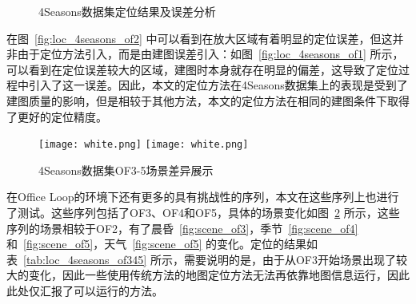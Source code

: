 \begin{figure}
  \centering
  \caption{4Seasons数据集定位结果及误差分析}
  \label{fig:loc_gnssmap}
\end{figure}

在图~\ref{fig:loc_4seasons_of2} 中可以看到在放大区域有着明显的定位误差，但这并非由于定位方法引入，而是由建图误差引入：如图~\ref{fig:loc_4seasons_of1} 所示，可以看到在定位误差较大的区域，建图时本身就存在明显的偏差，这导致了定位过程中引入了这一误差。因此，本文的定位方法在4Seasons数据集上的表现是受到了建图质量的影响，但是相较于其他方法，本文的定位方法在相同的建图条件下取得了更好的定位精度。

\begin{figure}
  \centering
  \texttt{[image: white.png]}
  \texttt{[image: white.png]}
  \caption{4Seasons数据集OF3-5场景差异展示}
  \label{fig:scene_of}
\end{figure}

在Office Loop的环境下还有更多的具有挑战性的序列，本文在这些序列上也进行了测试。这些序列包括了OF3、OF4和OF5，具体的场景变化如图~\ref{fig:scene_of} 所示，这些序列的场景相较于OF2，有了晨昏~\ref{fig:scene_of3}，季节~\ref{fig:scene_of4}和~\ref{fig:scene_of5}，天气~\ref{fig:scene_of5} 的变化。定位的结果如表~\ref{tab:loc_4seasons_of345} 所示，需要说明的是，由于从OF3开始场景出现了较大的变化，因此一些使用传统方法的地图定位方法无法再依靠地图信息运行，因此此处仅汇报了可以运行的方法。

